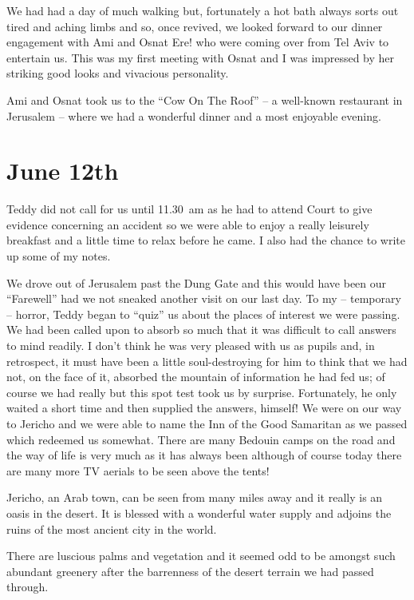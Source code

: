 We had had a day of much walking but, fortunately a hot bath always
sorts out tired and aching limbs and so, once revived, we looked
forward to our dinner engagement with Ami and Osnat Ere! who were
coming over from Tel Aviv to entertain us. This was my first meeting
with Osnat and I was impressed by her striking good looks and
vivacious personality.

Ami and Osnat took us to the ``Cow On The Roof'' -- a well-known
restaurant in Jerusalem -- where we had a wonderful dinner and a most
enjoyable evening.

\section{June 12th}

Teddy did not call for us until 11.30~am as he had to attend Court to
give evidence concerning an accident so we were able to enjoy a really
leisurely breakfast and a little time to relax before he came. I also
had the chance to write up some of my notes.

We drove out of Jerusalem past the Dung Gate and this would have been
our ``Farewell'' had we not sneaked another visit on our last day. To
my -- temporary -- horror, Teddy began to ``quiz'' us about the places
of interest we were passing. We had been called upon to absorb so much
that it was difficult to call answers to mind readily. I don't think
he was very pleased with us as pupils and, in retrospect, it must have
been a little soul-destroying for him to think that we had not, on the
face of it, absorbed the mountain of information he had fed us; of
course we had really but this spot test took us by
surprise. Fortunately, he only waited a short time and then supplied
the answers, himself! We were on our way to Jericho and we were able
to name the Inn of the Good Samaritan as we passed which redeemed us
somewhat. There are many Bedouin camps on the road and the way of life
is very much as it has always been although of course today there are
many more TV aerials to be seen above the tents!

Jericho, an Arab town, can be seen from many miles away and it really
is an oasis in the desert. It is blessed with a wonderful water supply
and adjoins the ruins of the most ancient city in the world.

There are luscious palms and vegetation and it seemed odd to be
amongst such abundant greenery after the barrenness of the desert
terrain we had passed through.

